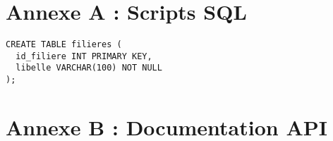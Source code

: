 \documentclass[french,12pt]{report} %
\begin{document}
\chapter{Annexe A : Scripts SQL}
\begin{lstlisting}[style=sqlstyle,caption={Script de création de la base}]
CREATE TABLE filieres (
  id_filiere INT PRIMARY KEY,
  libelle VARCHAR(100) NOT NULL
);
\end{lstlisting}

\chapter{Annexe B : Documentation API}

\end{document}
